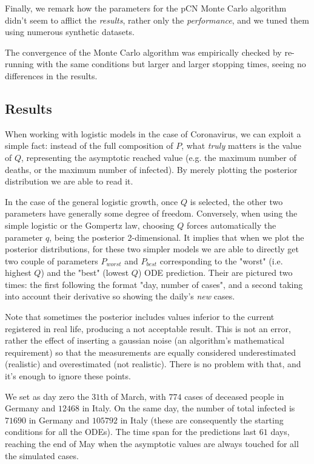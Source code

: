 \documentclass[8pt]{article}
\begin{document}
Finally, we remark how the parameters for the pCN Monte Carlo algorithm
didn't seem to afflict the \emph{results}, rather only the 
\emph{performance}, and we tuned them using numerous synthetic datasets.


The convergence of the Monte Carlo algorithm was empirically checked 
by re-running with the same conditions but larger and larger stopping
times, seeing no differences in the results.


\subsection{Results}
When working with logistic models in the case of Coronavirus,
we can exploit a simple fact:
instead of the full composition of $P$,
what \emph{truly} matters is the value of 
$Q$, representing the asymptotic reached value (e.g. the maximum
number of deaths, or the maximum number of infected).
By merely plotting the posterior distribution we are able to read it.


In the case of the general logistic growth, once $Q$ is selected,
the other two parameters have generally some degree of freedom.
Conversely, when using the simple logistic or the Gompertz law,
choosing $Q$ forces automatically the parameter $q$, being the posterior
 2-dimensional.
It implies that when we plot the posterior distributions,
for these two simpler models we are able to directly get
two couple of parameters
$P_{worst}$ and $P_{best}$ corresponding to the "worst" 
(i.e. highest $Q$) and the "best" (lowest $Q$) ODE prediction.
Their are pictured two times: the first following the format
"day, number of cases", and a second 
taking into account their derivative so showing the
daily's \emph{new} cases.


Note that sometimes the posterior includes values inferior
to the current registered in real life, producing a not acceptable
result. This is not an error, rather the effect of
inserting a gaussian noise (an algorithm's mathematical requirement)
so that the measurements are equally considered
underestimated (realistic) and overestimated (not realistic). 
There is no problem with that, and it's enough to ignore these points.


We set as day zero the $31$th of March, with $774$ cases of deceased people
in Germany and $12468$ in Italy. On the same day, the number of total
infected is $71690$ in Germany and $105792$ in Italy (these are
consequently the starting conditions for all the ODEs). The time span
for the predictions  last $61$ days, 
reaching the end of May when the  asymptotic values are
always touched for all the simulated cases.
\end{document}
